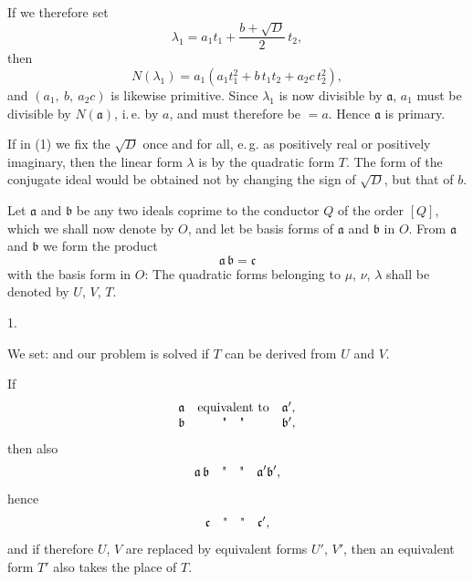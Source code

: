 If we therefore set
\[
\lambda_1 = a_1 t_1 + \frac{b+\sqrt D}{2}\,t_2,
\]
then
\[
N(\lambda_1) = a_1 (a_1 t_1^2 + b\,t_1 t_2 + a_2 c\,t_2^2),
\]
and $(a_1,\ b,\ a_2 c)$ is likewise primitive. Since $\lambda_1$ is now divisible by $\mathfrak{a}$, $a_1$ must be divisible by $N(\mathfrak{a})$, i.\,e. by $a$, and must therefore be $=a$. Hence $\mathfrak{a}$ is primary.

If in (1) we fix the $\sqrt D$ once and for all, e.\,g. as positively real or positively imaginary, then the linear form $\lambda$ is  by the quadratic form $T$. The form of the conjugate ideal would be obtained not by changing the sign of $\sqrt D$, but that of $b$.

Let $\mathfrak{a}$ and $\mathfrak{b}$ be any two ideals coprime to the conductor $Q$ of the order $[Q]$, which we shall now denote by $O$, and let
be basis forms of $\mathfrak{a}$ and $\mathfrak{b}$ in $O$. From $\mathfrak{a}$ and $\mathfrak{b}$ we form the product
\[
\mathfrak{a}\,\mathfrak{b} = \mathfrak{c}
\]
with the basis form in $O$:
The quadratic forms belonging to $\mu$, $\nu$, $\lambda$ shall be denoted by $U$, $V$, $T$.

1. 

We set:
and our problem is solved if $T$ can be derived from $U$ and $V$.

If
\[
\begin{array}{lcl}
\mathfrak{a} & \text{equivalent to} & \mathfrak{a}', \\
\mathfrak{b} & \text{\textquotedbl}\quad\text{\textquotedbl} & \mathfrak{b}',
\end{array}
\]
then also
\[
\mathfrak{a}\,\mathfrak{b} \quad \text{\textquotedbl}\quad\text{\textquotedbl} \quad \mathfrak{a}'\mathfrak{b}',
\]
hence
\[
\mathfrak{c} \quad \text{\textquotedbl}\quad\text{\textquotedbl} \quad \mathfrak{c}',
\]
and if therefore $U$, $V$ are replaced by equivalent forms $U'$, $V'$, then an equivalent form $T'$ also takes the place of $T$.
